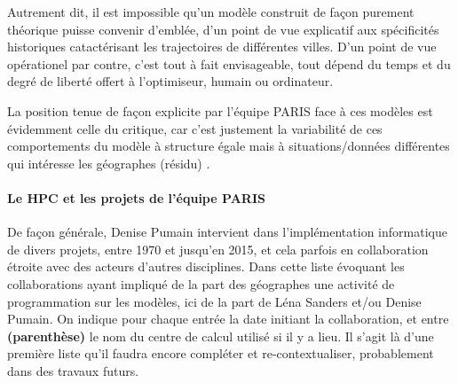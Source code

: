 Autrement dit, il est impossible qu'un modèle construit de façon purement théorique puisse convenir d'emblée, d'un point de vue explicatif aux spécificités historiques catactérisant les trajectoires de différentes villes. D'un point de vue opérationel par contre, c'est tout à fait envisageable, tout dépend du temps et du degré de liberté offert à l'optimiseur, humain ou ordinateur.

La position tenue de façon explicite par l'équipe PARIS face à ces modèles est évidemment celle du critique, car c'est justement la variabilité de ces comportements du modèle à structure égale mais à situations/données différentes qui intéresse les géographes (résidu) \autocite[99-103]{Pumain1989}.

\paragraph{Le HPC et les projets de l'équipe PARIS}

De façon générale, Denise Pumain intervient dans l’implémentation informatique de divers projets, entre 1970 et jusqu’en 2015, et cela parfois en collaboration étroite avec des acteurs d’autres disciplines. Dans cette liste évoquant les collaborations ayant impliqué de la part des géographes une activité de programmation sur les modèles, ici de la part de Léna Sanders et/ou Denise Pumain. On indique pour chaque entrée la date initiant la collaboration, et entre \textbf{(parenthèse)} le nom du centre de calcul utilisé si il y a lieu. Il s'agit là d'une première liste qu'il faudra encore compléter et re-contextualiser, probablement dans des travaux futurs.

